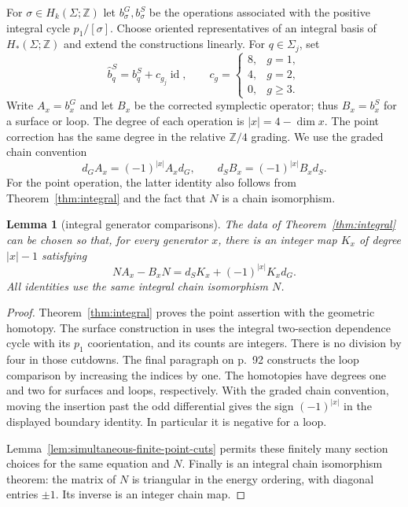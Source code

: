 \documentclass[11pt]{amsart}
\newtheorem{lemma}[theorem]{Lemma}
\theoremstyle{definition}
\theoremstyle{remark}
\theoremstyle{plain}
\newcommand{\ZZ}{\mathbb{Z}}
\newcommand{\id}{\operatorname{id}}
\begin{document}
For $\sigma\in H_k(\Sigma;\ZZ)$ let $b_\sigma^G,b_\sigma^S$
be the operations associated with the positive integral cycle
$p_1/[\sigma]$. Choose oriented representatives of an integral
basis of $H_*(\Sigma;\ZZ)$ and extend the constructions linearly.
For $q\in\Sigma_j$, set
\begin{equation}\label{eq:integral-corrected-point}
 \widehat b_q^S=b_q^S+c_{g_j}\id,\qquad
 c_g=
 \begin{cases}
 8,&g=1,\\
 4,&g=2,\\
 0,&g\geq3.
 \end{cases}
\end{equation}
Write $A_x=b_x^G$ and let $B_x$ be the corrected symplectic
operator; thus $B_x=b_x^S$ for a surface or loop.
The degree of each operation is $|x|=4-\dim x$.
The point correction has the same degree in the relative
$\ZZ/4$ grading.
We use the graded chain convention
\[
 d_GA_x=(-1)^{|x|}A_xd_G,\qquad
 d_SB_x=(-1)^{|x|}B_xd_S.
\]
For the point operation, the latter identity also follows
from Theorem~\ref{thm:integral} and the fact that $N$ is a
chain isomorphism.

\begin{lemma}[integral generator comparisons]
\label{lem:integral-generator-comparisons}
The data of Theorem~\ref{thm:integral} can be chosen so that,
for every generator $x$, there is an integer map $K_x$ of
degree $|x|-1$ satisfying
\begin{equation}\label{eq:generator-graded-homotopy}
 NA_x-B_xN=d_SK_x+(-1)^{|x|}K_xd_G.
\end{equation}
All identities use the same integral chain isomorphism $N$.
\end{lemma}

\begin{proof}
Theorem~\ref{thm:integral} proves the point assertion with
the geometric homotopy. The surface construction in
\cite[Section~7.2, pp.~88--92, Proposition~7.12]{DaeFukLip21a}
uses the integral two-section dependence cycle with its
$p_1$ coorientation, and its counts are integers.
There is no division by four in those cutdowns.
The final paragraph on p.~92 constructs the loop comparison
by increasing the indices by one. The homotopies have
degrees one and two for surfaces and loops, respectively.
With the graded chain convention, moving the insertion
past the odd differential gives the sign $(-1)^{|x|}$
in the displayed boundary identity. In particular it is
negative for a loop.

Lemma~\ref{lem:simultaneous-finite-point-cuts} permits
these finitely many section choices for the same equation
and $N$. Finally \cite[Theorem~3.29]{DaeFukLip21a} is an
integral chain isomorphism theorem: the matrix of $N$
is triangular in the energy ordering, with diagonal
entries $\pm1$. Its inverse is an integer chain map.
\end{proof}
\end{document}
